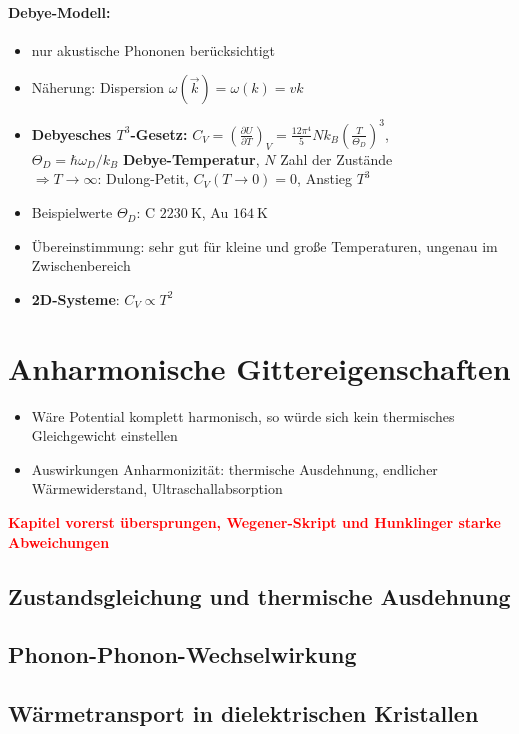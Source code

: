 \documentclass[a4paper,12pt]{article}
\begin{document}
\paragraph*{Debye-Modell:}\begin{itemize}
	\item nur akustische Phononen berücksichtigt
	\item Näherung: Dispersion $ \omega(\vec k) = \omega(k)=vk $
	\item \textbf{Debyesches $ T^3 $-Gesetz:} $ C_V = \left(\frac{\partial U}{\partial T}\right)_V = \frac{12 \pi^4}{5} N k_B \left(\frac{T}{\Theta_D}\right)^3$,\\
	$ \Theta_D = \hbar \omega_D/k_B$ \textbf{Debye-Temperatur}, $ N $ Zahl der Zustände\\
	$ \Rightarrow T\rightarrow\infty$: Dulong-Petit, $ C_V(T\rightarrow 0) = 0 $, Anstieg $ T^3 $
	\item Beispielwerte $ \Theta_D $: C $ \SI{2230}{\kelvin} $, Au $ \SI{164}{\kelvin} $
	\item Übereinstimmung: sehr gut für kleine und große Temperaturen, ungenau im Zwischenbereich
	\item \textbf{2D-Systeme}: $ C_V \propto T^2 $ 
	\end{itemize}
\section{Anharmonische Gittereigenschaften}
\begin{itemize}
	\item Wäre Potential komplett harmonisch, so würde sich kein thermisches Gleichgewicht einstellen
	\item Auswirkungen Anharmonizität: thermische Ausdehnung, endlicher Wärmewiderstand, Ultraschallabsorption
\end{itemize}
\textcolor{red}{\bf{} Kapitel vorerst übersprungen, Wegener-Skript und Hunklinger starke Abweichungen}
\subsection{Zustandsgleichung und thermische Ausdehnung}
\subsection{Phonon-Phonon-Wechselwirkung}
\subsection{Wärmetransport in dielektrischen Kristallen}
\end{document}
